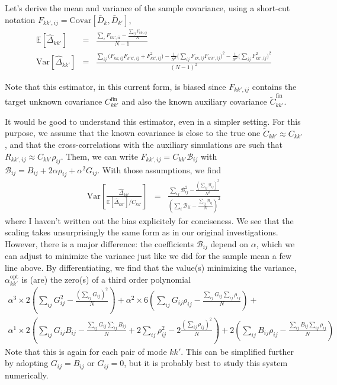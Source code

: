 \documentclass{aastex6}
\newcommand{\eqn}[1]{\begin{eqnarray}#1\end{eqnarray}}
\begin{document}
Let's derive the mean and variance of the sample covariance, using a short-cut notation $F_{kk',ij} = \mathrm{Covar}[\bar{D}_{k}, \bar{D}_{k'}]$,
\eqn{
	\mathbb{E}[\hat{\Delta}_{kk'}] &=&  \frac{ \sum_{i}F_{kk',ii} - \frac{\sum_{ij} F_{kk',ij}}{N} } {N-1}	 \\	
	 \mathrm{Var}\left[ \hat{\Delta}_{kk'}\right]  &=&	\frac{\sum_{ij} \bigl(F_{kk,ij}F_{k'k',ij} + F_{kk',ij}^2 \bigr) - \frac{1}{N^2}\bigl( \sum_{ij}F_{kk,ij}F_{k'k',ij} \bigr)^2 - \frac{1}{N^2}\bigl( \sum_{ij}F^2_{kk',ij} \bigr)^2 }{(N-1)^2}	
	}
	
	Note that this estimator, in this current form, is biased since  $F_{kk',ij}$ contains the target unknown covariance ${C}_{kk'}^\mathrm{fin}$ and also the known auxiliary covariance $\tilde{C}_{kk'}^\mathrm{fin}$.
	
It would be good to understand this estimator, even in a simpler setting. For this purpose, we assume that the known covariance is close to the true one $\tilde{C}_{kk'} \approx {C}_{kk'}$, and that the cross-correlations with the auxiliary simulations are such that $R_{kk',ij} \approx {C}_{kk'} \rho_{ij}$.
Them, we can write $F_{kk',ij} ={C}_{kk'}  \mathcal{B}_{ij}$ with $\mathcal{B}_{ij} = B_{ij} + 2 \alpha \rho_{ij} + \alpha^2 G_{ij}$. 
With those assumptions, we find
\eqn{
	 \mathrm{Var}\left[ \frac{\hat{\Delta}_{kk'}}{\mathbb{E}[\hat{\Delta}_{kk'}] /{C}_{kk'} }\right]  &=&  \frac{ \sum_{ij} \mathcal{B}_{ij}^2  - \frac{\left(\sum_{ij}\mathcal{B}_{ij}\right)^2}{N^2}}{ \left(\sum_i \mathcal{B}_{ii} - \frac{\sum_{ij}\mathcal{B}_{ij}}{N}\right)^2 }
	}
where I haven't written out the bias explicitely for conciseness. 	
We see that the scaling takes unsurprisingly the same form as in our original investigations. However, there is a major difference: the coefficients $\mathcal{B}_{ij}$ depend on $\alpha$, which we can adjust to minimize the variance just like we did for the sample mean a few line above.
By differentiating, we find that the value(s) minimizing the variance, ${\alpha^\mathrm{opt}_{kk'}}$ is (are) the zero(s) of a third order polynomial
\eqn{
	 \alpha^3  \times 2 \left(  \sum_{ij} G_{ij}^2 - \frac{(\sum_{ij} G_{ij})^2}{N}\right) + 
	  \alpha^2 \times 6 \left(  \sum_{ij} G_{ij} \rho_{ij} - \frac{\sum_{ij} G_{ij} \sum_{ij} \rho_{ij}}{N} \right) + \\ 
	  \alpha^1 \times 2 \left(  \sum_{ij} G_{ij} B_{ij} - \frac{\sum_{ij} G_{ij} \sum_{ij} B_{ij}}{N}  + 2 \sum_{ij} \rho^2_{ij} - 2\frac{(\sum_{ij}  \rho_{ij})^2}{N}  \right) + 
	    2 \left(  \sum_{ij} B_{ij} \rho_{ij} - \frac{\sum_{ij} B_{ij} \sum_{ij} \rho_{ij}}{N}  \right)
}
Note that this is again for each pair of mode $kk'$. 
This can be simplified further by adopting $G_{ij}=B_{ij}$ or $G_{ij} = 0$, but it is probably best to study this system numerically.
\end{document}
